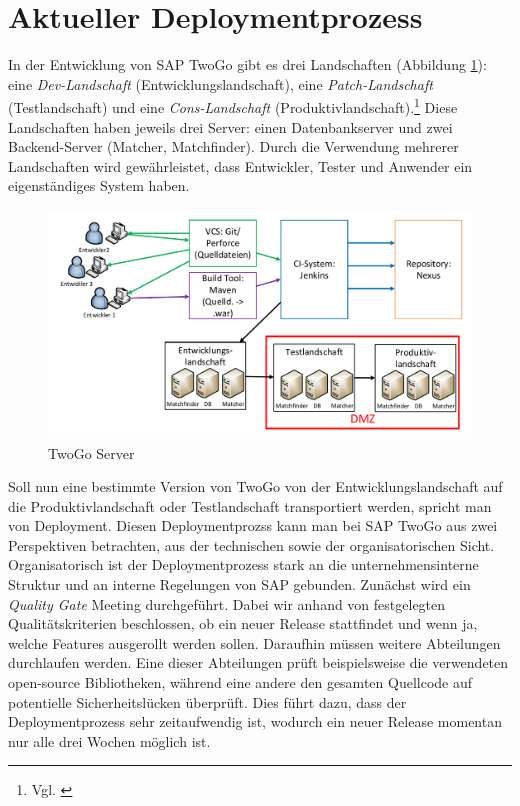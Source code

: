 \section{Aktueller Deploymentprozess}
In der Entwicklung von SAP TwoGo gibt es drei Landschaften (Abbildung \ref{fig:Server}): eine \textit{Dev-Landschaft} (Entwicklungslandschaft), eine \textit{Patch-Landschaft} (Testlandschaft) und eine \textit{Cons-Landschaft} (Produktivlandschaft).\footnote{Vgl. \cite{wiki}} Diese Landschaften haben jeweils drei Server: einen Datenbankserver und zwei Backend-Server (Matcher, Matchfinder). Durch die Verwendung mehrerer Landschaften wird gewährleistet, dass Entwickler, Tester und Anwender ein eigenständiges System haben.
\begin{figure}[H]
\centering
\includegraphics[width=1\linewidth]{../images/Server_Struktur2.pdf}
\vspace{-30pt}
\caption{TwoGo Server}
\label{fig:Server}
\vspace{-10pt}
\end{figure}
Soll nun eine bestimmte Version von TwoGo von der Entwicklungslandschaft auf die Produktivlandschaft oder Testlandschaft transportiert werden, spricht man von Deployment. Diesen Deploymentprozss kann man bei SAP TwoGo aus zwei Perspektiven betrachten, aus der technischen sowie der organisatorischen Sicht.\\
Organisatorisch ist der Deploymentprozess stark an die unternehmensinterne Struktur und an interne Regelungen von SAP gebunden. Zunächst wird ein \textit{Quality Gate} Meeting durchgeführt. Dabei wir anhand von festgelegten Qualitätskriterien beschlossen, ob ein neuer Release stattfindet und wenn ja, welche Features ausgerollt werden sollen. Daraufhin müssen weitere Abteilungen durchlaufen werden. Eine dieser Abteilungen prüft beispielsweise die verwendeten open-source Bibliotheken, während eine andere den gesamten Quellcode auf potentielle Sicherheitslücken überprüft. Dies führt dazu, dass der Deploymentprozess sehr zeitaufwendig ist, wodurch ein neuer Release momentan nur alle drei Wochen möglich ist.\\
